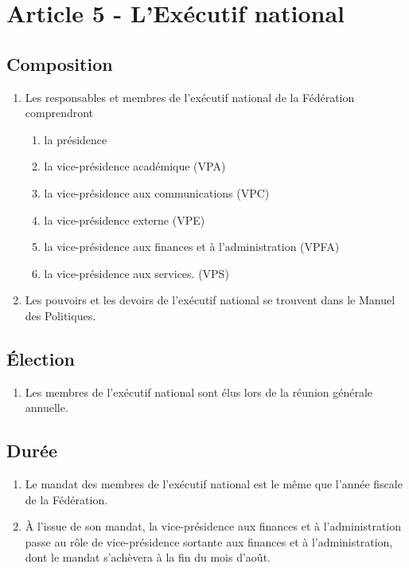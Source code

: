\section{Article 5 - L'Exécutif national}
\label{article-5-l-executif-national}

\subsection{Composition}
\label{composition}

\begin{enumerate}
 \item
  Les responsables et membres de l'exécutif national de la Fédération comprendront

  \begin{enumerate}
   \item la présidence
   \item la vice-présidence académique (VPA)
   \item la vice-présidence aux communications (VPC)
   \item la vice-présidence externe (VPE)
   \item la vice-présidence aux finances et à l'administration (VPFA)
   \item la vice-présidence aux services. (VPS)
  \end{enumerate}

 \item
  Les pouvoirs et les devoirs de l'exécutif national se trouvent dans le Manuel des Politiques.
\end{enumerate}

\subsection{Élection}
\label{election}

\begin{enumerate}
 \item
  Les membres de l'exécutif national sont élus lors de la réunion générale annuelle.
\end{enumerate}

\subsection{Durée}
\label{duree}

\begin{enumerate}
 \item
  Le mandat des membres de l'exécutif national est le même que l'année fiscale de la Fédération.
 \item
  À l'issue de son mandat, la vice-présidence aux finances et à l’administration passe au rôle de vice-présidence sortante aux finances et à l'administration, dont le mandat s'achèvera à la fin du mois d'août.
\end{enumerate}
